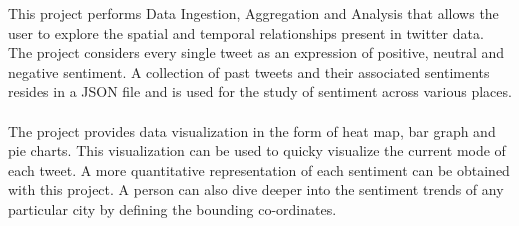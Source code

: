 \documentclass[12pt, oneside]{article}   	%
\begin{document}
This project performs Data Ingestion, Aggregation and Analysis that allows the user to explore the spatial and temporal relationships present in twitter data. The project considers every single tweet as an expression of positive, neutral and negative sentiment. A collection of past tweets and their associated sentiments resides in a JSON file and is used for the study of sentiment across various places.\\
\\
The project provides data visualization in the form of heat map, bar graph and pie charts. This visualization can be used to quicky visualize the current mode of each tweet. A more quantitative representation of each sentiment can be obtained with this project. A person can also dive deeper into the sentiment trends of any particular city by defining the bounding co-ordinates.
\end{document}
